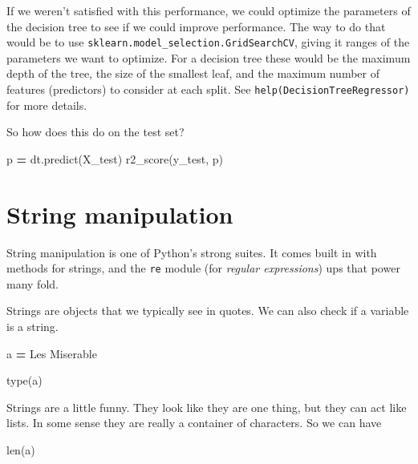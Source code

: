 \documentclass[
  letterpaper,
]{scrbook}
\newenvironment{Shaded}{\begin{snugshade}}{\end{snugshade}}
\newcommand{\BuiltInTok}[1]{#1}
\newcommand{\NormalTok}[1]{#1}
\newcommand{\OperatorTok}[1]{\textcolor[rgb]{0.81,0.36,0.00}{\textbf{#1}}}
\newcommand{\StringTok}[1]{\textcolor[rgb]{0.31,0.60,0.02}{#1}}
\begin{document}
If we weren't satisfied with this performance, we could optimize the parameters of the decision tree to see
if we could improve performance. The way to do that would be to use \texttt{sklearn.model\_selection.GridSearchCV}, giving
it ranges of the parameters we want to optimize. For a decision tree these would be the maximum depth of the tree, the size of the smallest leaf, and the maximum number of features (predictors) to consider at each split. See \texttt{help(DecisionTreeRegressor)} for more details.

So how does this do on the test set?

\begin{Shaded}
\begin{Highlighting}[]
\NormalTok{p }\OperatorTok{=}\NormalTok{ dt.predict(X\_test)}
\NormalTok{r2\_score(y\_test, p)}
\end{Highlighting}
\end{Shaded}

\hypertarget{string-manipulation}{%
\chapter{String manipulation}\label{string-manipulation}}

String manipulation is one of Python's strong suites. It comes built in with methods for strings, and the \texttt{re} module (for \emph{regular expressions}) ups that power many fold.

Strings are objects that we typically see in quotes. We can also check if a variable is a string.

\begin{Shaded}
\begin{Highlighting}[]
\NormalTok{a }\OperatorTok{=} \StringTok{\textquotesingle{}Les Miserable\textquotesingle{}}

\BuiltInTok{type}\NormalTok{(a)}
\end{Highlighting}
\end{Shaded}

Strings are a little funny. They look like they are one thing, but they can act like lists. In some sense they
are really a container of characters. So we can have

\begin{Shaded}
\begin{Highlighting}[]
\BuiltInTok{len}\NormalTok{(a)}
\end{Highlighting}
\end{Shaded}
\end{document}
